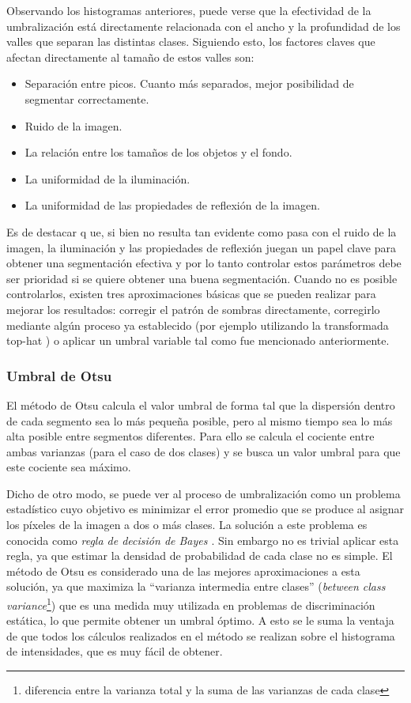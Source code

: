 Observando los histogramas anteriores, puede verse que la efectividad de la umbralización está directamente relacionada con el ancho y la profundidad de los valles que separan las distintas clases. Siguiendo esto, los factores claves que afectan directamente al tamaño de estos valles son:
\begin{itemize}
\item Separación entre picos. Cuanto más separados, mejor posibilidad de segmentar correctamente.
\item Ruido de la imagen.
\item La relación entre los tamaños de los objetos y el fondo.
\item La uniformidad de la iluminación.
\item La uniformidad de las propiedades de reflexión de la imagen.
\end{itemize}

Es de destacar q ue, si bien no resulta tan evidente como pasa con el ruido de la imagen, la iluminación y las propiedades de reflexión juegan un papel clave para obtener una segmentación efectiva y por lo tanto controlar estos parámetros debe ser prioridad si se quiere obtener una buena segmentación. Cuando no es posible controlarlos, existen tres aproximaciones básicas que se pueden realizar para mejorar los resultados: corregir el patrón de sombras directamente, corregirlo mediante algún proceso ya establecido (por ejemplo utilizando la transformada top-hat \cite{tophat}) o aplicar un umbral variable tal como fue mencionado anteriormente.

\subsubsection{Umbral de Otsu}

El método de Otsu \cite{otsu} calcula el valor umbral de forma tal que la dispersión dentro de cada segmento sea lo más pequeña posible, pero al mismo tiempo sea lo más alta posible entre segmentos diferentes. Para ello se calcula el cociente entre ambas varianzas (para el caso de dos clases) y se busca un valor umbral para que este cociente sea máximo.

Dicho de otro modo, se puede ver al proceso de umbralización como un problema estadístico cuyo objetivo es minimizar el error promedio que se produce al asignar los píxeles de la imagen a dos o más clases. La solución a este problema es conocida como \textit{regla de decisión de Bayes \cite{bayes}}. Sin embargo  no es trivial aplicar esta regla, ya que estimar la densidad de probabilidad de cada clase no es simple. El método de Otsu es considerado una de las mejores aproximaciones a esta solución, ya que maximiza la ``varianza intermedia entre clases'' (\textit{between class variance}\footnote{diferencia entre la varianza total y la suma de las varianzas de cada clase\cite{betweenvarianze}}) que es una medida muy utilizada en problemas de discriminación estática, lo que permite obtener un umbral óptimo. A esto se le suma la ventaja de que todos los cálculos realizados en el método se realizan sobre el histograma de intensidades, que es muy fácil de obtener.


